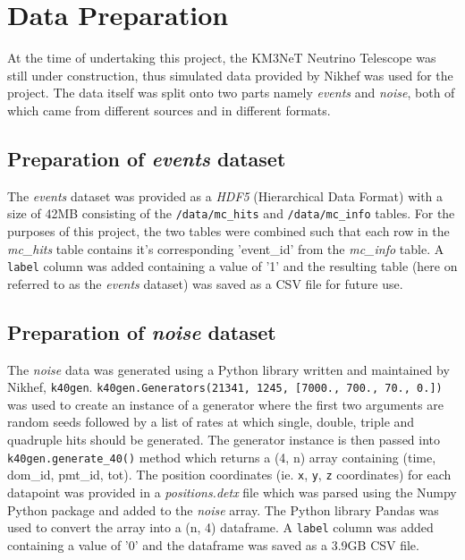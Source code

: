 
\chapter{Data Preparation} %
\label{cha:data-prep}


\graphicspath{{1-introduction/figures/}}


At the time of undertaking this project, the KM3NeT Neutrino Telescope was
still under construction, thus  simulated data provided by Nikhef was used for
the project. The data itself was split onto two parts namely \emph{events} and
\emph{noise}, both of which came from different sources and in different
formats.

\section{Preparation of \emph{events} dataset}%
\label{sec:data-prep-events}
The \emph{events} dataset was provided as a \emph{HDF5} (Hierarchical Data
Format) with a size of 42MB consisting of the \texttt{/data/mc\_hits} and
\texttt{/data/mc\_info} tables. For the purposes of this project, the two
tables were combined such that each row in the \textit{mc\_hits} table contains
it's corresponding 'event\_id' from the \textit{mc\_info}
table. A \texttt{label} column was added containing a value of '1' and the
resulting table (here on referred to as the \emph{events} dataset) was saved as
a CSV file for future use.

\section{Preparation of \emph{noise} dataset}%
\label{sec:data-prep-noise}
The \emph{noise} data was generated using a Python library written and
maintained by Nikhef, \texttt{k40gen}. \texttt{k40gen.Generators(21341, 1245,
[7000., 700., 70., 0.])} was used to create an instance of a generator where
the first two arguments are random seeds followed by a list of rates at which
single, double, triple and quadruple hits should be generated. The generator
instance is then passed into \texttt{k40gen.generate\_40()} method which
returns a (4, n) array containing (time, dom\_id, pmt\_id, tot). The position
coordinates (ie. \texttt{x}, \texttt{y}, \texttt{z} coordinates) for each
datapoint was provided in a \emph{positions.detx} file which was parsed using
the Numpy Python package \cite{numpy} and added to the \emph{noise} array. The
Python library Pandas \cite{pandas} was used to convert the array into a (n, 4)
dataframe. A \texttt{label} column was added containing a value of '0' and the
dataframe was saved as a 3.9GB CSV file.

